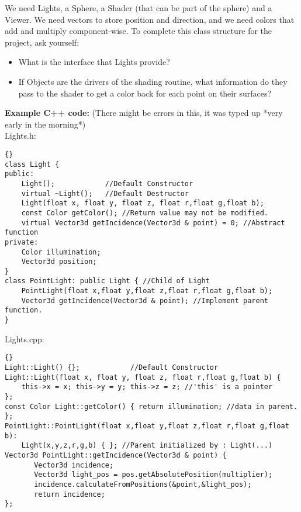 \documentclass[]{article}
\begin{document}
We need Lights, a Sphere, a Shader (that can be part of the sphere) and a Viewer. We need vectors to store position and direction, and we need colors that add and multiply component-wise. To complete this class structure for the project, ask yourself:
\begin{itemize}
    \item What is the interface that Lights provide?
    \item If Objects are the drivers of the shading routine, what information do they pass to the shader to get a color back for each point on their surfaces?
\end{itemize}
\textbf{Example C++ code:} (There might be errors in this, it was typed up *very early in the morning*)
\lstset{language=c++}
\lstset{commentstyle=\textit}\\
Lights.h:
\begin{lstlisting}[frame=tb]{}
class Light {
public:
    Light();            //Default Constructor
    virtual ~Light();   //Default Destructor
    Light(float x, float y, float z, float r,float g,float b);
    const Color getColor(); //Return value may not be modified.
    virtual Vector3d getIncidence(Vector3d & point) = 0; //Abstract function
private:
    Color illumination;
    Vector3d position;
}
class PointLight: public Light { //Child of Light
    PointLight(float x,float y,float z,float r,float g,float b);
    Vector3d getIncidence(Vector3d & point); //Implement parent function.
}
\end{lstlisting}
Lights.cpp:
\begin{lstlisting}[frame=tb]{}
Light::Light() {};            //Default Constructor
Light::Light(float x, float y, float z, float r,float g,float b) {
    this->x = x; this->y = y; this->z = z; //'this' is a pointer
};
const Color Light::getColor() { return illumination; //data in parent. };
PointLight::PointLight(float x,float y,float z,float r,float g,float b): 
    Light(x,y,z,r,g,b) { }; //Parent initialized by : Light(...)
Vector3d PointLight::getIncidence(Vector3d & point) {
       Vector3d incidence;
       Vector3d light_pos = pos.getAbsolutePosition(multiplier);
       incidence.calculateFromPositions(&point,&light_pos);
       return incidence;
};
\end{lstlisting}
\end{document}
